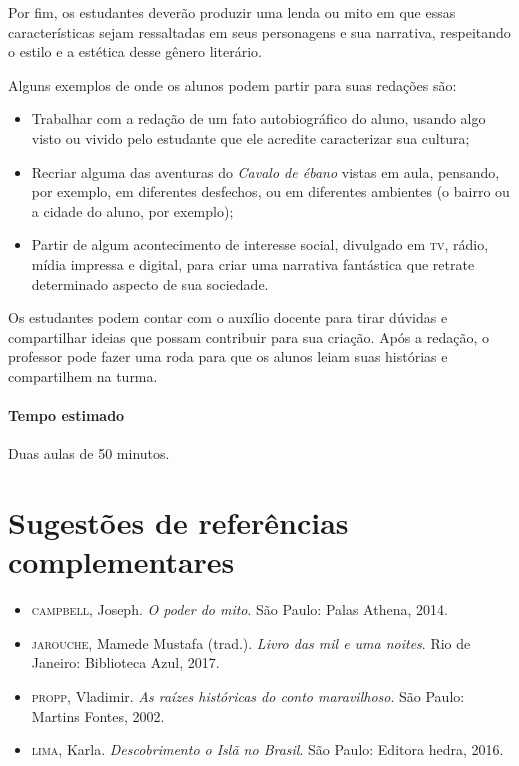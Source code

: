 \documentclass[11pt]{extarticle}
\begin{document}
Por fim, os estudantes deverão produzir uma lenda ou mito em que essas características sejam ressaltadas em seus personagens e sua narrativa, respeitando o estilo e a estética desse gênero literário.

Alguns exemplos de onde os alunos podem partir para suas redações são:

\begin{itemize}
\item Trabalhar com a redação de um fato autobiográfico do aluno, usando algo visto ou vivido pelo estudante que ele acredite caracterizar sua cultura;

\item Recriar alguma das aventuras do \textit{Cavalo de ébano} vistas em aula, pensando, por exemplo, em diferentes desfechos, ou em diferentes ambientes (o bairro ou a cidade do aluno, por exemplo);

\item Partir de algum acontecimento de interesse social, divulgado em \textsc{tv}, rádio, mídia impressa e digital, para criar uma narrativa fantástica que retrate determinado aspecto de sua sociedade.
\end{itemize}

Os estudantes podem contar com o auxílio docente para tirar dúvidas e compartilhar ideias que possam contribuir para sua criação. Após a redação, o professor pode fazer uma roda para que os alunos leiam suas histórias e compartilhem na turma.

\paragraph{Tempo estimado} Duas aulas de 50 minutos.

\section{Sugestões de referências complementares}


\begin{itemize}
\item \textsc{campbell}, Joseph. \textit{O poder do mito}. São Paulo: Palas Athena, 2014.

\item \textsc{jarouche}, Mamede Mustafa (trad.). \textit{Livro das mil e uma noites}. Rio de Janeiro: Biblioteca Azul, 2017.

\item \textsc{propp}, Vladimir. \textit{As raízes históricas do conto maravilhoso}. São Paulo: Martins Fontes, 2002.

\item \textsc{lima}, Karla. \textit{Descobrimento o Islã no Brasil}. São Paulo: Editora hedra, 2016.
\end{itemize}
\end{document}
